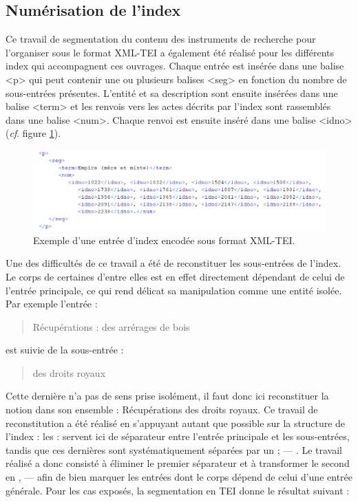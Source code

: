 \documentclass[a4paper,12pt,twoside]{book}
\begin{document}
	\subsection{Numérisation de l’index}

	Ce travail de segmentation du contenu des instruments de recherche pour l'organiser sous le format XML-TEI a également été réalisé pour les différents index qui accompagnent ces ouvrages. Chaque entrée est insérée dans une balise <p> qui peut contenir une ou plusieurs balises <seg> en fonction du nombre de sous-entrées présentes. L'entité et sa description sont ensuite insérées dans une balise <term> et les renvois vers les actes décrits par l'index sont rassemblés dans une balise <num>. Chaque renvoi est ensuite inséré dans une balise <idno> (\textit{cf}. figure \ref{index_TEI}).
	
	\begin{figure}
		\centering
		\includegraphics[width=\textwidth]{Images/index_en_TEI.png}
		\caption{Exemple d'une entrée d'index encodée sous format XML-TEI.}
		\label{index_TEI}
	\end{figure} 
	
	Une des difficultés de ce travail a été de reconstituer les sous-entrées de l'index. Le corps de certaines d'entre elles est en effet directement dépendant de celui de l'entrée principale, ce qui rend délicat sa manipulation comme une entité isolée. Par exemple l'entrée :
	
	\begin{quotation}
		Récupérations : des arrérages de bois
	\end{quotation}

	\noindent est suivie de la sous-entrée :
	
	\begin{quotation}
		des droits royaux
	\end{quotation}

	\noindent Cette dernière n'a pas de sens prise isolément, il faut donc ici reconstituer la notion dans son ensemble : \og Récupérations des droits royaux\fg{}. Ce travail de reconstitution a été réalisé en s'appuyant autant que possible sur la structure de l'index : les \og :\fg{} servent ici de séparateur entre l'entrée principale et les sous-entrées, tandis que ces dernières sont systématiquement séparées par un \og ; — \fg{}. Le travail réalisé a donc consisté à éliminer le premier séparateur et à transformer le second en \og{}  , — \fg{} afin de bien marquer les entrées dont le corps dépend de celui d'une entrée générale. Pour les cas exposés, la segmentation en TEI donne le résultat suivant :
	
\end{document}
